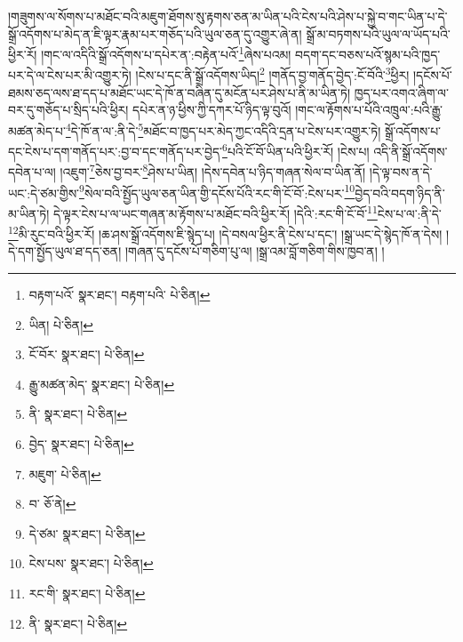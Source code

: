 །གཟུགས་ལ་སོགས་པ་མཐོང་བའི་མཇུག་ཐོགས་སུ་རྟགས་ཅན་མ་ཡིན་པའི་ངེས་པའི་ཤེས་པ་སྐྱེ་བ་གང་ཡིན་པ་དེ་སྒྲོ་འདོགས་པ་མེད་ན་ཇི་ལྟར་རྣམ་པར་གཅོད་པའི་ཡུལ་ཅན་དུ་འགྱུར་ཞེ་ན། སྒྲོ་མ་བཏགས་པའི་ཡུལ་ལ་ཡོད་པའི་ཕྱིར་རོ། །གང་ལ་འདིའི་སྒྲོ་འདོགས་པ་དཔེར་ན་:བརྟེན་པའོ་\footnote{བརྟག་པའོ་  སྣར་ཐང་། བརྟག་པའི་  པེ་ཅིན། }ཞེས་པའམ། བདག་དང་བཅས་པའོ་སྙམ་པའི་ཁྱད་པར་དེ་ལ་ངེས་པར་མི་འགྱུར་ཏེ། །ངེས་པ་དང་ནི་སྒྲོ་འདོགས་ཡིད།\footnote{ཡིན།  པེ་ཅིན། } །གནོད་བྱ་གནོད་བྱེད་:ངོ་བོའི་\footnote{ངོ་བོར་  སྣར་ཐང་།  པེ་ཅིན། }ཕྱིར། །དངོས་པོ་ཐམས་ཅད་ལས་ཐ་དད་པ་མཐོང་ཡང་དེ་ཁོ་ན་བཞིན་དུ་མངོན་པར་ཤེས་པ་ནི་མ་ཡིན་ཏེ། ཁྱད་པར་འགའ་ཞིག་ལ་བར་དུ་གཅོད་པ་སྲིད་པའི་ཕྱིར། དཔེར་ན་ཉ་ཕྱིས་ཀྱི་དཀར་པོ་ཉིད་ལྟ་བུའོ། །གང་ལ་རྟོགས་པ་པོའི་འཁྲུལ་:པའི་རྒྱུ་མཚན་མེད་པ་\footnote{རྒྱུ་མཚན་མེད་  སྣར་ཐང་།  པེ་ཅིན། }དེ་ཁོ་ན་ལ་:ནི་དེ་\footnote{ནི་  སྣར་ཐང་།  པེ་ཅིན། }མཐོང་བ་ཁྱད་པར་མེད་ཀྱང་འདིའི་དྲན་པ་ངེས་པར་འགྱུར་ཏེ། སྒྲོ་འདོགས་པ་དང་ངེས་པ་དག་གནོད་པར་:བྱ་བ་དང་གནོད་པར་བྱེད་\footnote{བྱེད་  སྣར་ཐང་།  པེ་ཅིན། }པའི་ངོ་བོ་ཡིན་པའི་ཕྱིར་རོ། །ངེས་པ། འདི་ནི་སྒྲོ་འདོགས་དབེན་པ་ལ། །འཇུག་\footnote{མཇུག་  པེ་ཅིན། }ཅེས་བྱ་བར་\footnote{བ་  ཅོ་ནེ། }ཤེས་པ་ཡིན། །དེས་དབེན་པ་ཉིད་གཞན་སེལ་བ་ཡིན་ནོ། །དེ་ལྟ་བས་ན་དེ་ཡང་:དེ་ཙམ་གྱིས་\footnote{དེ་ཙམ་  སྣར་ཐང་།  པེ་ཅིན། }སེལ་བའི་སྤྱོད་ཡུལ་ཅན་ཡིན་གྱི་དངོས་པོའི་རང་གི་ངོ་བོ་:ངེས་པར་\footnote{ངེས་པས་  སྣར་ཐང་།  པེ་ཅིན། }བྱེད་བའི་བདག་ཉིད་ནི་མ་ཡིན་ཏེ། དེ་ལྟར་ངེས་པ་ལ་ཡང་གཞན་མ་རྟོགས་པ་མཐོང་བའི་ཕྱིར་རོ། །དེའི་:རང་གི་ངོ་བོ་\footnote{རང་གི་  སྣར་ཐང་།  པེ་ཅིན། }ངེས་པ་ལ་:ནི་དེ་\footnote{ནི་  སྣར་ཐང་།  པེ་ཅིན། }མི་རུང་བའི་ཕྱིར་རོ། །ཆ་ཤས་སྒྲོ་འདོགས་ཇི་སྙེད་པ། །དེ་བསལ་ཕྱིར་ནི་ངེས་པ་དང་། །སྒྲ་ཡང་དེ་སྙེད་ཁོ་ན་དེས། །དེ་དག་སྤྱོད་ཡུལ་ཐ་དད་ཅན། །གཞན་དུ་དངོས་པོ་གཅིག་པུ་ལ། །སྒྲ་འམ་བློ་གཅིག་གིས་ཁྱབ་ན། །
